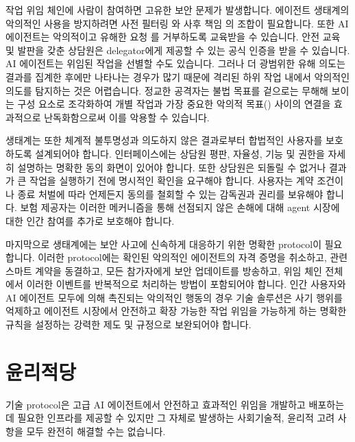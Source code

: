\documentclass[11pt, a4paper, twocolumn, copyright, goog]{google}
\begin{document}
작업 위임 체인에 사람이 참여하면 고유한 보안 문제가 발생합니다. 에이전트 생태계의 악의적인 사용을 방지하려면 사전 필터링 \citep{fatehkia2025sgm, fedorov2024llamaguard31bint4compact, rebedea2023nemoguardrailstoolkitcontrollable, dong2024building}와 사후 책임 \citep{dignum2020responsibility, franklin2022causal}의 조합이 필요합니다. 또한 AI 에이전트는 악의적이고 유해한 요청 \citep{yuan2025refuse, yu2024robust}를 거부하도록 교육받을 수 있습니다. 안전 교육 및 발판을 갖춘 상담원은 delegator에게 제공할 수 있는 공식 인증을 받을 수 있습니다. AI 에이전트는 위임된 작업을 선별할 수도 있습니다. 그러나 더 광범위한 유해 의도는 결과를 집계한 후에만 나타나는 경우가 많기 때문에 격리된 하위 작업 내에서 악의적인 의도를 탐지하는 것은 어렵습니다. 정교한 공격자는 불법 목표를 겉으로는 무해해 보이는 구성 요소로 조각화하여 개별 작업과 가장 중요한 악의적 목표(\citep{ashton2023definitions}) 사이의 연결을 효과적으로 난독화함으로써 이를 악용할 수 있습니다.

생태계는 또한 체계적 불투명성과 의도하지 않은 결과로부터 합법적인 사용자를 보호하도록 설계되어야 합니다. 인터페이스에는 상담원 평판, 자율성, 기능 및 권한을 자세히 설명하는 명확한 동의 화면이 있어야 합니다. 또한 상담원은 되돌릴 수 없거나 결과가 큰 작업을 실행하기 전에 명시적인 확인을 요구해야 합니다. 사용자는 계약 조건이나 종료 처벌에 따라 언제든지 동의를 철회할 수 있는 감독권과 권리를 보유해야 합니다. 보험 제공자는 \citep{tomei2025ai} 이러한 메커니즘을 통해 선점되지 않은 손해에 대해 agent 시장에 대한 인간 참여를 추가로 보호해야 합니다.

마지막으로 생태계에는 보안 사고에 신속하게 대응하기 위한 명확한 protocol이 필요합니다. 이러한 protocol에는 확인된 악의적인 에이전트의 자격 증명을 취소하고, 관련 스마트 계약을 동결하고, 모든 참가자에게 보안 업데이트를 방송하고, 위임 체인 전체에서 이러한 이벤트를 반복적으로 처리하는 방법이 포함되어야 합니다. 인간 사용자와 AI 에이전트 모두에 의해 촉진되는 악의적인 행동의 경우 기술 솔루션은 사기 행위를 억제하고 에이전트 시장에서 안전하고 확장 가능한 작업 위임을 가능하게 하는 명확한 규칙을 설정하는 강력한 제도 및 규정으로 보완되어야 합니다.

\section{윤리적당}
\label{sec:sociotechnical}

기술 protocol은 고급 AI 에이전트에서 안전하고 효과적인 위임을 개발하고 배포하는 데 필요한 인프라를 제공할 수 있지만 그 자체로 발생하는 사회기술적, 윤리적 고려 사항을 모두 완전히 해결할 수는 없습니다. 
\end{document}
